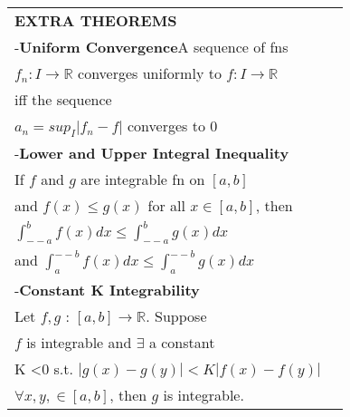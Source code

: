 \documentclass[10 pt,landscape]{article}
\begin{document}
\begin{multicols}{4}
\begin{tabular}{@{}ll@{}}
\textbf{EXTRA THEOREMS}\\
-\textbf{Uniform Convergence}A sequence of fns\\ $f_n:I \to \mathbb{R}$ converges uniformly to $f:I \to \mathbb{R}$\\ iff the sequence\\ $a_n=sup_I|f_n-f|$ converges to $0$\\
-\textbf{Lower and Upper Integral Inequality} \\If $f$ and $g$ are integrable fn on $[a,b]$\\ and $f(x) \leq g(x)$ for all $x \in [a,b]$, then\\ $\int_{--a}^{b}f(x)dx \leq \int_{--a}^{b}g(x)dx$\\ and $\int_{a}^{--b}f(x)dx \leq \int_{a}^{--b}g(x)dx$\\
-\textbf{Constant K Integrability}\\Let $f,g$ : $[a,b] \to \mathbb{R}$.  Suppose\\ $f$ is integrable and $\exists$ a constant \\K \textless  0 s.t. $|g(x)-g(y)|< K|f(x)-f(y)|$\\ $\forall x,y,\in [a,b]$, then $g$ is integrable.
\end{tabular} 






\end{multicols}
\end{document}
